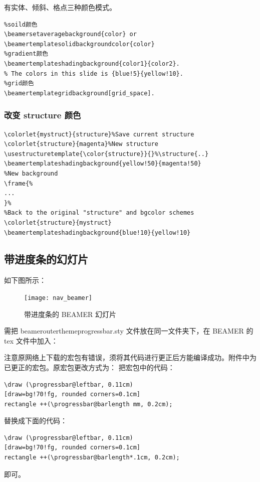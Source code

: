 有实体、倾斜、格点三种颜色模式。
\begin{shaded}
\begin{Verbatim}
%soild颜色
\beamersetaveragebackground{color} or
\beamertemplatesolidbackgroundcolor{color}
%gradient颜色
\beamertemplateshadingbackground{color1}{color2}.
% The colors in this slide is {blue!5}{yellow!10}.
%grid颜色
\beamertemplategridbackground[grid_space].
\end{Verbatim}
\end{shaded}
\subsubsection{改变 structure 颜色}



\begin{shaded}
\begin{Verbatim}
\colorlet{mystruct}{structure}%Save current structure
\colorlet{structure}{magenta}%New structure
\usestructuretemplate{\color{structure}}{}%\structure{..}
\beamertemplateshadingbackground{yellow!50}{magenta!50}
%New background
\frame{%
...
}%
%Back to the original "structure" and bgcolor schemes
\colorlet{structure}{mystruct}
\beamertemplateshadingbackground{blue!10}{yellow!10}
\end{Verbatim}
\end{shaded}


\subsection{带进度条的幻灯片}
如下图所示：
\begin{figure}[H]
\centering
  \texttt{[image: nav\_beamer]}\\
  \caption{带进度条的 BEAMER 幻灯片}\label{nav_beamer}
\end{figure}

需把 beamerouterthemeprogressbar.sty 文件放在同一文件夹下，在 BEAMER 的  tex 文件中加入：
\begin{cmd}
\end{cmd}
注意原网络上下载的宏包有错误，须将其代码进行更正后方能编译成功。附件中为已更正的宏包。原宏包更改方式为：
把宏包中的代码：
\begin{lstlisting}
\draw (\progressbar@leftbar, 0.11cm)
[draw=bg!70!fg, rounded corners=0.1cm]
rectangle ++(\progressbar@barlength mm, 0.2cm);
\end{lstlisting}
替换成下面的代码：
\begin{lstlisting}
\draw (\progressbar@leftbar, 0.11cm)
[draw=bg!70!fg, rounded corners=0.1cm]
rectangle ++(\progressbar@barlength*.1cm, 0.2cm);
\end{lstlisting}
即可。

